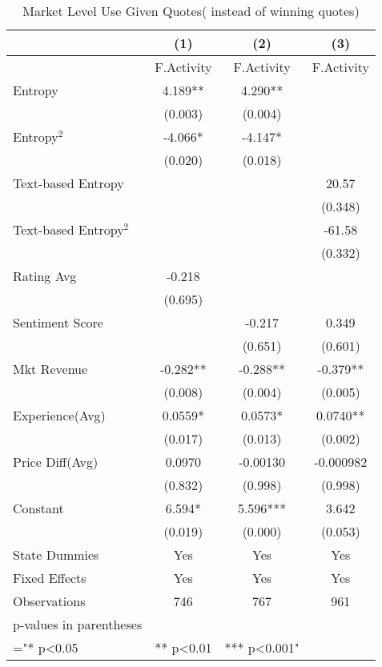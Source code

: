 \begin{table}[]
\centering
\begin{tabular}{@{}lccc@{}}
\toprule
 & (1) & (2) & (3) \\ \midrule
 & F.Activity & F.Activity & F.Activity \\
Entropy & 4.189** & 4.290** &  \\
 & (0.003) & (0.004) &  \\
Entropy$^2$ & -4.066* & -4.147* &  \\
 & (0.020) & (0.018) &  \\
Text-based Entropy &  &  & 20.57 \\
 &  &  & (0.348) \\
Text-based Entropy$^2$ &  &  & -61.58 \\
 &  &  & (0.332) \\
Rating Avg & -0.218 &  &  \\
 & (0.695) &  &  \\
Sentiment Score &  & -0.217 & 0.349 \\
 &  & (0.651) & (0.601) \\
Mkt Revenue & -0.282** & -0.288** & -0.379** \\
 & (0.008) & (0.004) & (0.005) \\
Experience(Avg) & 0.0559* & 0.0573* & 0.0740** \\
 & (0.017) & (0.013) & (0.002) \\
Price Diff(Avg) & 0.0970 & -0.00130 & -0.000982 \\
 & (0.832) & (0.998) & (0.998) \\
Constant & 6.594* & 5.596*** & 3.642 \\
 & (0.019) & (0.000) & (0.053) \\
State Dummies  & Yes        & Yes        & Yes        \\
Fixed Effects  & Yes        & Yes        & Yes        \\
Observations & 746 & 767 & 961 \\
p-values in parentheses &  &  &  \\
="* p\textless{}0.05 & ** p\textless{}0.01 & *** p\textless{}0.001" &  \\ \bottomrule
\end{tabular}
\caption{Market Level Use Given Quotes( instead of winning quotes) }
\label{reg_mkt_alt_measure}
\end{table}